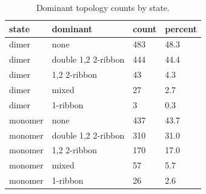 \begin{table}[ht]
\centering
\caption{Dominant topology counts by state.}
\label{tab:dominant_counts}
\begin{tabular}{llll}
\hline
state & dominant & count & percent \\
\hline
dimer & none & 483 & 48.3 \\
dimer & double 1,2 2-ribbon & 444 & 44.4 \\
dimer & 1,2 2-ribbon &  43 & 4.3 \\
dimer & mixed &  27 & 2.7 \\
dimer & 1-ribbon &   3 & 0.3 \\
monomer & none & 437 & 43.7 \\
monomer & double 1,2 2-ribbon & 310 & 31.0 \\
monomer & 1,2 2-ribbon & 170 & 17.0 \\
monomer & mixed &  57 & 5.7 \\
monomer & 1-ribbon &  26 & 2.6 \\
\hline
\end{tabular}
\end{table}
